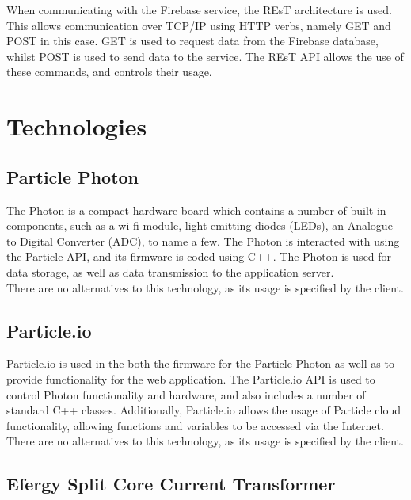 \documentclass{article}
\begin{document}
	When communicating with the Firebase service, the REsT architecture 
	is used. This allows communication over TCP/IP using HTTP verbs, 
	namely GET and POST in this case. GET is used to request data from 
	the Firebase database, whilst POST is used to send data to the 
	service. The REsT API allows the use of these commands, and controls 
	their usage.

\newpage

\section{Technologies}
	
	\subsection{Particle Photon}
	
	The Photon is a compact hardware board which contains a number of 
	built in components, such as a wi-fi module, light emitting diodes 
	(LEDs), an Analogue to Digital Converter (ADC), to name a few. The 
	Photon is interacted with using the Particle API, and its firmware is 
	coded using C++. The Photon is used for data storage, as well as data 
	transmission to the application server.\\
	
	\noindent
	There are no alternatives to this technology, as its usage is 
	specified by the client.
	
	\subsection{Particle.io}
	
	Particle.io is used in the both the firmware for the Particle Photon as well as to provide functionality for the web application. The Particle.io API is used to control Photon 
	functionality and hardware, and also includes a number of standard C++ classes. Additionally, Particle.io allows the usage of Particle cloud functionality, allowing functions and variables 
	to be accessed via the Internet.\\
	
	\noindent
	There are no alternatives to this technology, as its usage is specified by the client.
	
	\subsection{Efergy Split Core Current Transformer}
	
\end{document}
